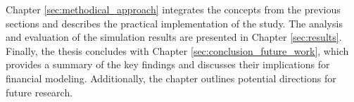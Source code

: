 Chapter \ref{sec:methodical_approach} integrates the concepts from the previous sections and describes the practical implementation of the study. The analysis and evaluation of the simulation results are presented in Chapter \ref{sec:results}. Finally, the thesis concludes with Chapter \ref{sec:conclusion_future_work}, which provides a summary of the key findings and discusses their implications for financial modeling. Additionally, the chapter outlines potential directions for future research.